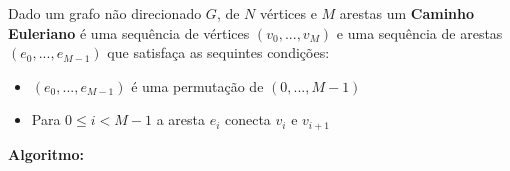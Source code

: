  Dado um grafo não direcionado $G$, de $N$ vértices e $M$ arestas um \textbf{Caminho Euleriano} é uma sequência de vértices
$(v_0, ..., v_M)$ e uma sequência de arestas $(e_0, ..., e_{M-1})$ que satisfaça as sequintes condições: 

\begin{itemize}
    \item $(e_0, ..., e_{M-1})$ é uma permutação de $(0, ..., M-1)$
    \item Para $0 \leq i < M-1$ a aresta $e_i$ conecta $v_i$ e $v_{i+1}$
\end{itemize}

\textbf{Algoritmo:}
\begin{lstlisting}[language=C++, breaklines=true]

\end{lstlisting}

